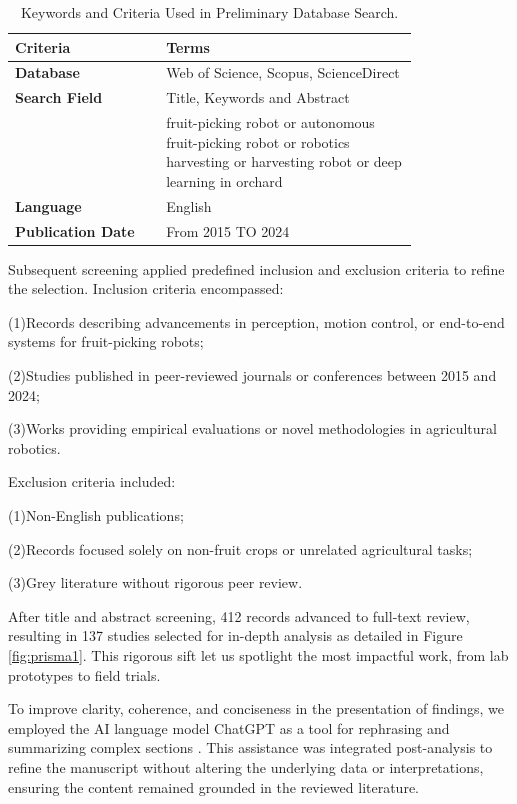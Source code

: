 \documentclass[a4paper,fleqn]{cas-dc}
\begin{document}
\begin{table}[ht]
\scriptsize
\caption{Keywords and Criteria Used in Preliminary Database Search.} 
\label{tab:keywords} 
\begin{tabular}{p{0.3\linewidth} p{0.5\linewidth}}
\hline
\textbf{Criteria} & \textbf{Terms} \\ \hline
\textbf{Database}  &  Web of Science, Scopus, ScienceDirect \\
\textbf{Search Field} & Title, Keywords and Abstract\\
 & fruit-picking robot or autonomous fruit-picking robot  or robotics harvesting or harvesting robot or deep learning in orchard\\
\textbf{Language} & English \\
\textbf{Publication Date} & From 2015 TO 2024 \\ \hline 
\end{tabular}
\end{table}

Subsequent screening applied predefined inclusion and exclusion criteria to refine the selection. Inclusion criteria encompassed:

(1)Records describing advancements in perception, motion control, or end-to-end systems for fruit-picking robots;

(2)Studies published in peer-reviewed journals or conferences between 2015 and 2024;

(3)Works providing empirical evaluations or novel methodologies in agricultural robotics.

Exclusion criteria included:

(1)Non-English publications;

(2)Records focused solely on non-fruit crops or unrelated agricultural tasks;

(3)Grey literature without rigorous peer review.

After title and abstract screening, 412 records advanced to full-text review, resulting in 137 studies selected for in-depth analysis as detailed in Figure \ref{fig:prisma1}. This rigorous sift let us spotlight the most impactful work, from lab prototypes to field trials. 

To improve clarity, coherence, and conciseness in the presentation of findings, we employed the AI language model ChatGPT as a tool for rephrasing and summarizing complex sections \cite{gruda2024three}. This assistance was integrated post-analysis to refine the manuscript without altering the underlying data or interpretations, ensuring the content remained grounded in the reviewed literature.
\end{document}
